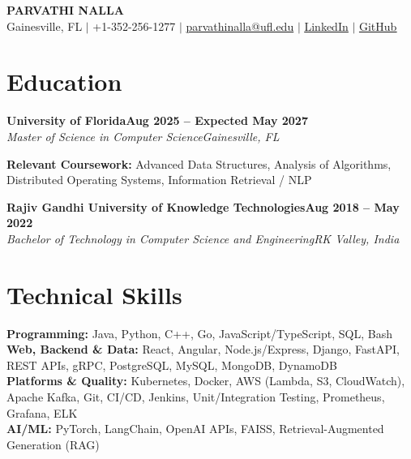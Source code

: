 \documentclass[10pt,letterpaper]{article}
\newcommand{\schoolEntry}[4]{%
  \textbf{#1}\hfill\textbf{#4}\\[-1pt]
  \textit{#2}\hfill\textit{#3}\par\vspace{-1.3pt}
}
\begin{document}
\fontsize{10.2}{11.35}\selectfont
\begin{center}
  {\color{navy}\fontsize{18}{20}\selectfont\bfseries PARVATHI NALLA}\\[2pt]
  Gainesville, FL \quad $\vert$ \quad +1-352-256-1277 \quad $\vert$ \quad \href{mailto:parvathinalla@ufl.edu}{parvathinalla@ufl.edu} \quad $\vert$ \quad \href{https://www.linkedin.com/in/parvathinallauf}{\underline{LinkedIn}} \quad $\vert$ \quad \href{https://github.com/parvathinalla}{\underline{GitHub}}
\end{center}
\vspace{-10pt}

\section{Education}
\schoolEntry{University of Florida}{Master of Science in Computer Science}{Gainesville, FL}{Aug 2025 -- Expected May 2027}
\textbf{Relevant Coursework:} Advanced Data Structures, Analysis of Algorithms, Distributed Operating Systems, Information Retrieval / NLP\par
\vspace{1pt}
\schoolEntry{Rajiv Gandhi University of Knowledge Technologies}{Bachelor of Technology in Computer Science and Engineering}{RK Valley, India}{Aug 2018 -- May 2022}

\section{Technical Skills}
\textbf{Programming:} Java, Python, C++, Go, JavaScript/TypeScript, SQL, Bash\\
\textbf{Web, Backend \& Data:} React, Angular, Node.js/Express, Django, FastAPI, REST APIs, gRPC, PostgreSQL, MySQL, MongoDB, DynamoDB\\
\textbf{Platforms \& Quality:} Kubernetes, Docker, AWS (Lambda, S3, CloudWatch), Apache Kafka, Git, CI/CD, Jenkins, Unit/Integration Testing, Prometheus, Grafana, ELK\\
\textbf{AI/ML:} PyTorch, LangChain, OpenAI APIs, FAISS, Retrieval-Augmented Generation (RAG)
\end{document}
